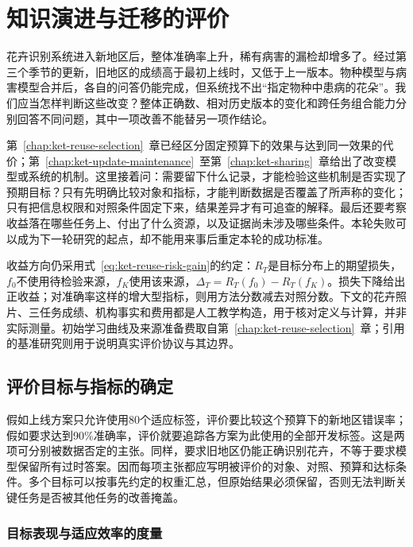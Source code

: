 \chapter{知识演进与迁移的评价}
\label{chap:ket-evaluation}

花卉识别系统进入新地区后，整体准确率上升，稀有病害的漏检却增多了。经过第三个季节的更新，旧地区的成绩高于最初上线时，又低于上一版本。物种模型与病害模型合并后，各自的问答仍能完成，但系统找不出“指定物种中患病的花朵”。我们应当怎样判断这些改变？整体正确数、相对历史版本的变化和跨任务组合能力分别回答不同问题，其中一项改善不能替另一项作结论。

第~\ref{chap:ket-reuse-selection}~章已经区分固定预算下的效果与达到同一效果的代价；第~\ref{chap:ket-update-maintenance}~至第~\ref{chap:ket-sharing}~章给出了改变模型或系统的机制。这里接着问：需要留下什么记录，才能检验这些机制是否实现了预期目标？只有先明确比较对象和指标，才能判断数据是否覆盖了所声称的变化；只有把信息权限和对照条件固定下来，结果差异才有可追查的解释。最后还要考察收益落在哪些任务上、付出了什么资源，以及证据尚未涉及哪些条件。本轮失败可以成为下一轮研究的起点，却不能用来事后重定本轮的成功标准。

收益方向仍采用式~\eqref{eq:ket-reuse-risk-gain}的约定：$R_T$是目标分布上的期望损失，$f_0$不使用待检验来源，$f_K$使用该来源，$\Delta_T=R_T(f_0)-R_T(f_K)$。损失下降给出正收益；对准确率这样的增大型指标，则用方法分数减去对照分数。下文的花卉照片、三任务成绩、机构事实和费用都是人工教学构造，用于核对定义与计算，并非实际测量。初始学习曲线及来源准备费取自第~\ref{chap:ket-reuse-selection}~章；引用的基准研究则用于说明真实评价协议与其边界。

\section{评价目标与指标的确定}
\label{sec:ket-evaluation-metrics}

假如上线方案只允许使用80个适应标签，评价要比较这个预算下的新地区错误率；假如要求达到90\%准确率，评价就要追踪各方案为此使用的全部开发标签。这是两项可分别被数据否定的主张。同样，要求旧地区仍能正确识别花卉，不等于要求模型保留所有过时答案。因而每项主张都应写明被评价的对象、对照、预算和达标条件。多个目标可以按事先约定的权重汇总，但原始结果必须保留，否则无法判断关键任务是否被其他任务的改善掩盖。

\subsection{目标表现与适应效率的度量}
\label{sec:ket-evaluation-target}

